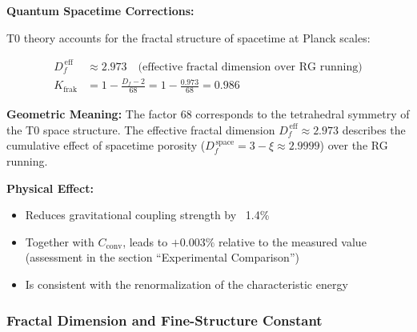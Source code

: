 	\begin{derivation}
		\textbf{Quantum Spacetime Corrections:}
		
		T0 theory accounts for the fractal structure of spacetime at Planck scales:
		
		\begin{align}
			D_f^{\,\text{eff}} &\approx 2.973 \quad \text{(effective fractal dimension over RG running)} \\
			K_{\text{frak}} &= 1 - \frac{D_f - 2}{68} = 1 - \frac{0.973}{68} = 0.986
		\end{align}
		
		\textbf{Geometric Meaning:} 
		The factor 68 corresponds to the tetrahedral symmetry of the T0 space structure. The effective fractal dimension $D_f^{\,\text{eff}} \approx 2.973$ describes the cumulative effect of spacetime porosity ($D_f^{\,\text{space}} = 3 - \xi \approx 2.9999$) over the RG running.
		
		\textbf{Physical Effect:}
		\begin{itemize}
			\item Reduces gravitational coupling strength by ~1.4\%
			\item Together with $C_{\text{conv}}$, leads to $+0.003\%$ relative to the measured value (assessment in the section \enquote{Experimental Comparison})
			\item Is consistent with the renormalization of the characteristic energy
		\end{itemize}
	\end{derivation}
	
	\subsubsection{Fractal Dimension and Fine-Structure Constant}
	

